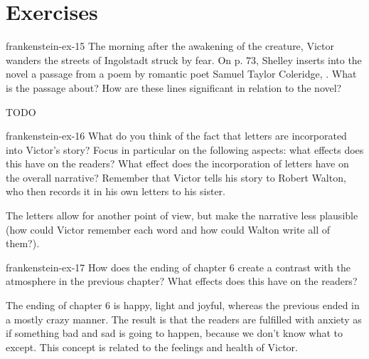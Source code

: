 \documentclass[preview]{standalone}
\begin{document}
\genpage

\section{Exercises}

\begin{snippetexercise}{frankenstein-ex-15}
    {The morning after the awakening of the creature, Victor wanders the streets of Ingolstadt struck
    by fear. On p. 73, Shelley inserts into the novel a passage from a poem by romantic poet Samuel
    Taylor Coleridge, . What is the passage about? How are these
    lines significant in relation to the novel?}
    
    \begin{center}
    \end{center}
    
    TODO 
\end{snippetexercise}

\begin{snippetexercise}{frankenstein-ex-16}
    {What do you think of the fact that letters are incorporated into Victor's story? Focus in particular
    on the following aspects: what effects does this have on the readers? What effect does the
    incorporation of letters have on the overall narrative? Remember that Victor tells his story to Robert
    Walton, who then records it in his own letters to his sister.}
    
    The letters allow for another point of view, but make the narrative less plausible
    (how could Victor remember each word and how could Walton write all of them?).
\end{snippetexercise}

\begin{snippetexercise}{frankenstein-ex-17}
    {How does the ending of chapter 6 create a contrast with the atmosphere in the previous chapter?
    What effects does this have on the readers?}
    
    The ending of chapter 6 is happy, light and joyful, whereas the previous
    ended in a mostly crazy manner. The result is that the readers are fulfilled with anxiety
    as if something bad and sad is going to happen, because we don't know what to except.
    This concept is related to the feelings and health of Victor.
\end{snippetexercise}
\end{document}

